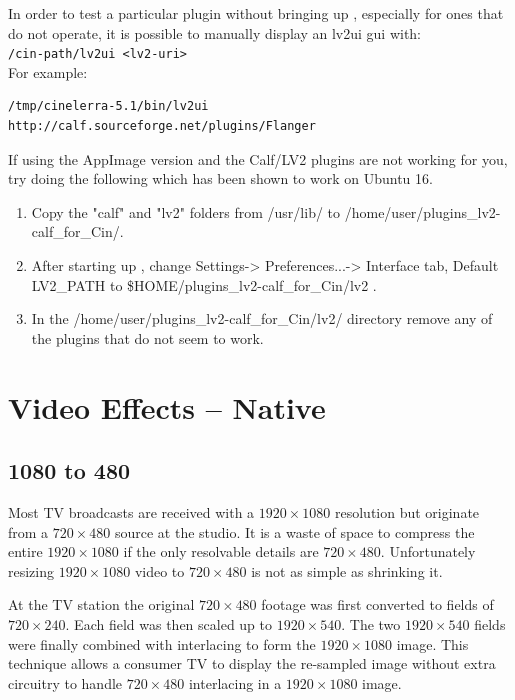 In order to test a particular plugin without bringing up \CGG{}, especially for ones that do not operate, it is possible to manually display an lv2ui gui with: \\
\texttt{/cin-path/lv2ui <lv2-uri>} \\
For example:

\begin{lstlisting}[style=sh]
/tmp/cinelerra-5.1/bin/lv2ui http://calf.sourceforge.net/plugins/Flanger
\end{lstlisting}

If using the AppImage version and the Calf/LV2 plugins are not working for you, try doing the 
following which has been shown to work on Ubuntu 16.

\begin{enumerate}
    \item Copy the "calf" and "lv2" folders from /usr/lib/  to  /home/user/plugins\_lv2-calf\_for\_Cin/.
    \item After starting up \CGG{}, change Settings-> Preferences...-> Interface tab, Default LV2\_PATH to
    \$HOME/plugins\_lv2-calf\_for\_Cin/lv2 .
    \item In the /home/user/plugins\_lv2-calf\_for\_Cin/lv2/ directory remove any of the plugins that do not seem to work.
\end{enumerate}

\section[Video Effects --- Native]{Video Effects -- Native}%
\label{sec:video_effects_native}

\subsection{1080 to 480}%
\label{sub:1080_to_480}

Most TV broadcasts are received with a $1920\times1080$ resolution but originate from a $720\times480$ source at the studio. It is a waste of space to compress the entire $1920\times1080$ if the only resolvable details are $720\times480$. Unfortunately resizing $1920\times1080$ video to $720\times480$ is not as simple as shrinking it.

At the TV station the original $720\times480$ footage was first converted to fields of $720\times240$. Each field was then scaled up to $1920\times540$. The two $1920\times540$ fields were finally combined with interlacing to form the $1920\times1080$ image. This technique allows a consumer TV to display the re-sampled image without extra circuitry to handle $720\times480$ interlacing in a $1920\times1080$ image.

